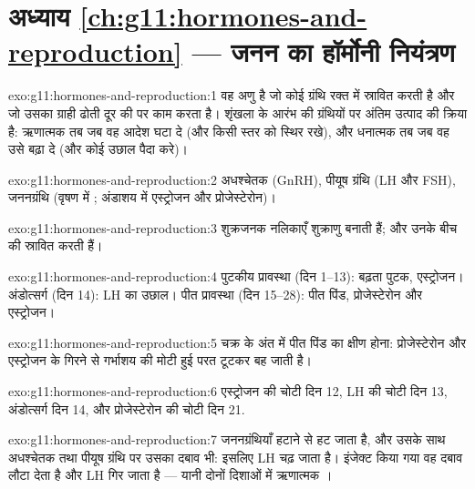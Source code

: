 \section*{अध्याय \ref{ch:g11:hormones-and-reproduction} --- जनन का हॉर्मोनी नियंत्रण}

\begin{solution}{exo:g11:hormones-and-reproduction:1}
 वह अणु है जो कोई ग्रंथि रक्त में स्रावित करती है और जो उसका ग्राही
ढोती दूर की  पर काम करता है।  शृंखला के आरंभ की
ग्रंथियों पर अंतिम उत्पाद की क्रिया है: ऋणात्मक तब जब वह आदेश घटा दे (और
किसी स्तर को स्थिर रखे), और धनात्मक तब जब वह उसे बढ़ा दे (और कोई उछाल पैदा
करे)।
\end{solution}

\begin{solution}{exo:g11:hormones-and-reproduction:2}
अधश्चेतक (GnRH), पीयूष ग्रंथि (LH और FSH), जननग्रंथि (वृषण में
; अंडाशय में एस्ट्रोजन और प्रोजेस्टेरोन)।
\end{solution}

\begin{solution}{exo:g11:hormones-and-reproduction:3}
शुक्रजनक नलिकाएँ शुक्राणु बनाती हैं; और उनके बीच की 
 स्रावित करती हैं।
\end{solution}

\begin{solution}{exo:g11:hormones-and-reproduction:4}
पुटकीय प्रावस्था (दिन 1--13): बढ़ता पुटक, एस्ट्रोजन। अंडोत्सर्ग (दिन 14):
LH का उछाल। पीत प्रावस्था (दिन 15--28): पीत पिंड, प्रोजेस्टेरोन और
एस्ट्रोजन।
\end{solution}

\begin{solution}{exo:g11:hormones-and-reproduction:5}
चक्र के अंत में पीत पिंड का क्षीण होना: प्रोजेस्टेरोन और एस्ट्रोजन के
गिरने से गर्भाशय की मोटी हुई परत टूटकर बह जाती है।
\end{solution}

\begin{solution}{exo:g11:hormones-and-reproduction:6}
एस्ट्रोजन की चोटी दिन 12, LH की चोटी दिन 13, अंडोत्सर्ग दिन 14, और
प्रोजेस्टेरोन की चोटी दिन 21.
\end{solution}

\begin{solution}{exo:g11:hormones-and-reproduction:7}
जननग्रंथियाँ हटाने से  हट जाता है, और उसके साथ अधश्चेतक तथा
पीयूष ग्रंथि पर उसका दबाव भी: इसलिए LH चढ़ जाता है। इंजेक्ट किया गया
 वह दबाव लौटा देता है और LH गिर जाता है --- यानी दोनों दिशाओं
में ऋणात्मक ।
\end{solution}

